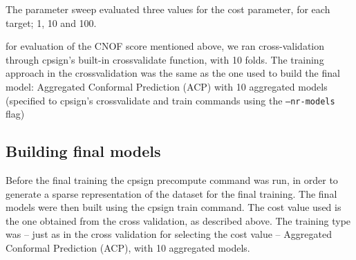 \documentclass[utf8]{frontiersSCNS} %
\begin{document}
The parameter sweep evaluated three values for the cost parameter, for each
target; 1, 10 and 100.

for evaluation of the CNOF score mentioned above, we ran cross-validation
through cpsign's built-in crossvalidate function, with 10 folds.  The training
approach in the crossvalidation was the same as the one used to build the final
model: Aggregated Conformal Prediction (ACP) with 10 aggregated models
(specified to cpsign's crossvalidate and train commands using the
\texttt{--nr-models} flag)

\subsection{Building final models}

Before the final training the cpsign precompute command was run, in order to
generate a sparse representation of the dataset for the final training.
The final models were then built using the cpsign train command. The cost value
used is the one obtained from the cross validation, as described above.
The training type was -- just as in the cross validation for selecting the cost
value -- Aggregated Conformal Prediction (ACP), with 10 aggregated models.


%

\end{document}
